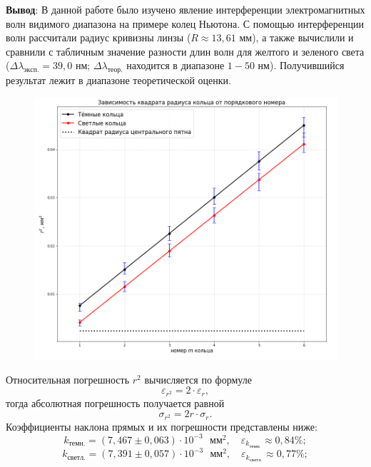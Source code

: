 \documentclass[a4paper,12pt]{article}
\begin{document}
\textbf{Вывод}: В данной работе было изучено явление интерференции электромагнитных волн видимого диапазона на примере колец Ньютона. С помощью интерференции волн рассчитали радиус кривизны линзы ($R \approx 13,61$ мм), а также вычислили и сравнили с табличным значение разности длин волн для желтого и зеленого света ($\Delta \lambda_{эксп.} = 39,0$ нм; \text{ } $\Delta \lambda_{теор.}$ находится в диапазоне $1-50$ нм). Получившийся результат лежит в диапазоне теоретической оценки.

\newpage
\begin{figure}[H]\label{fig: r2_r'2(m)}
    \centering
    \includegraphics[width = \textwidth]{r2_r'2(m).png}
\end{figure}
Относительная погрешность $r^2$ вычисляется по формуле 
\[\varepsilon_{r^2} = 2 \cdot \varepsilon_r,\]
тогда абсолютная погрешность получается равной
\[\sigma_{r^2} = 2r \cdot \sigma_r.\]
Коэффициенты наклона прямых и их погрешности представлены ниже: 
\[k_{темн.} = (7,467 \pm  0,063) \cdot 10^{-3} \text{ } мм^2, \quad \varepsilon_{k_{темн.}} \approx 0,84 \%;\]
\[k_{светл.} = (7,391 \pm  0,057) \cdot 10^{-3} \text{ } мм^2, \quad \varepsilon_{k_{светл.}} \approx 0,77 \%;\]


\end{document}
